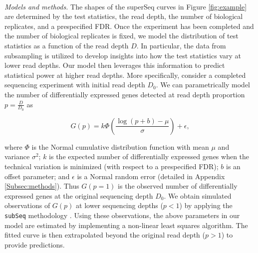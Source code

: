 \documentclass[11pt]{article}
\begin{document}
\  

\noindent \textit{Models and methods.} The shapes of the superSeq curves in Figure \ref{fig:example} are determined by the test statistics, the read depth, the number of biological replicates, and a prespecified FDR. Once the experiment has been completed and the number of biological replicates is fixed, we model the distribution of test statistics as a function of the read depth $D$. In particular, the data from subsampling is utilized to develop insights into how the test statistics vary at lower read depths. Our model then leverages this information to predict statistical power at higher read depths. More specifically, consider a completed sequencing experiment with initial read depth $D_{0}$. We can parametrically model the number of differentially expressed genes detected at read depth proportion $p = \frac{D}{D_{0}}$ as

$$
G(p) = k\Phi\left(\dfrac{\log(p+b) - \mu}{\sigma}\right) + \epsilon,
$$

\noindent where $\Phi$ is the Normal cumulative distribution function with mean $\mu$ and variance $\sigma^{2}$; $k$ is the expected number of differentially expressed genes when the technical variation is minimized (with respect to a prespecified FDR); $b$ is an offset parameter; and $\epsilon$ is a Normal random error (detailed in Appendix \ref{Subsec:methods}). Thus $G(p=1)$ is the observed number of differentially expressed genes at the original sequencing depth $D_{0}$. We obtain simulated observations of $G(p)$ at lower sequencing depths ($p<1$) by applying the \texttt{subSeq} methodology \cite{Robinson:2014ho}. Using these observations, the above parameters in our model are estimated by implementing a non-linear least squares algorithm. The fitted curve is then extrapolated beyond the original read depth ($p>1$) to provide predictions.
\end{document}
